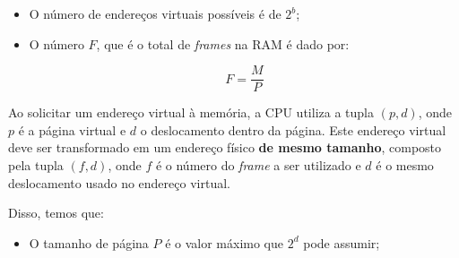 \begin{itemize}
  \item O número de endereços virtuais possíveis é de $2^b$;

  \item O número $F$, que é o total de \textit{frames} na RAM é dado por:

  \begin{equation*}
    F = \frac{M}{P}
  \end{equation*}
\end{itemize}

Ao solicitar um endereço virtual à memória, a CPU utiliza a tupla $(p,d)$, onde $p$ é a página virtual e $d$ o deslocamento dentro da página. Este endereço virtual deve ser transformado em um endereço físico \textbf{de mesmo tamanho}, composto pela tupla $(f,d)$, onde $f$ é o número do \textit{frame} a ser utilizado e $d$ é o mesmo deslocamento usado no endereço virtual.

Disso, temos que:

\begin{itemize}
  \item O tamanho de página $P$ é o valor máximo que $2^d$ pode assumir;
\end{itemize}
